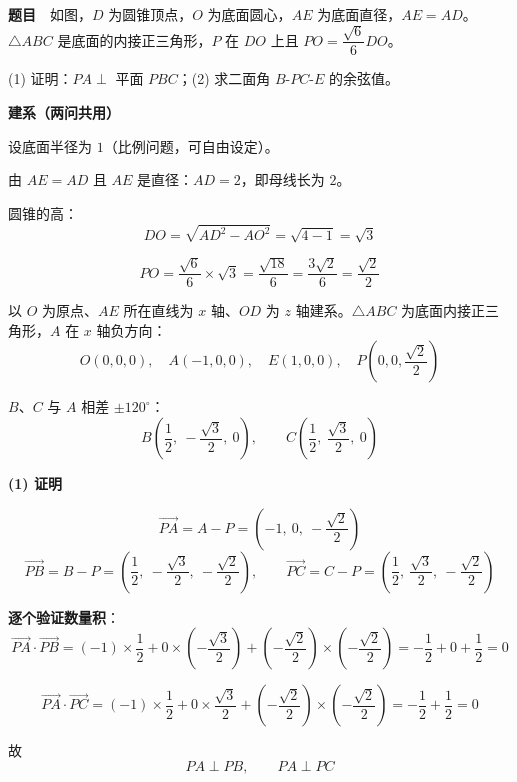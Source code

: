 \par\medskip


\textbf{题目}　如图，$D$ 为圆锥顶点，$O$ 为底面圆心，$AE$ 为底面直径，$AE=AD$。$\triangle ABC$ 是底面的内接正三角形，$P$ 在 $DO$ 上且 $PO=\dfrac{\sqrt6}6DO$。

\begin{center}\end{center}

  (1) 证明：$PA\perp$ 平面 $PBC$；(2) 求二面角 $B\text{-}PC\text{-}E$ 的余弦值。

\par\medskip

\textbf{建系（两问共用）}

设底面半径为 $1$（比例问题，可自由设定）。

由 $AE=AD$ 且 $AE$ 是直径：$AD=2$，即母线长为 $2$。

圆锥的高：
\[DO=\sqrt{AD^{2}-AO^{2}}=\sqrt{4-1}=\sqrt3\]

\[PO=\frac{\sqrt6}6\times\sqrt3=\frac{\sqrt{18}}6=\frac{3\sqrt2}6=\frac{\sqrt2}2\]

以 $O$ 为原点、$AE$ 所在直线为 $x$ 轴、$OD$ 为 $z$ 轴建系。$\triangle ABC$ 为底面内接正三角形，$A$ 在 $x$ 轴负方向：
\[O(0,0,0),\quad A(-1,0,0),\quad E(1,0,0),\quad P\left(0,0,\frac{\sqrt2}2\right)\]

$B$、$C$ 与 $A$ 相差 $\pm120^\circ$：
\[B\left(\frac12,\ -\frac{\sqrt3}2,\ 0\right),\qquad C\left(\frac12,\ \frac{\sqrt3}2,\ 0\right)\]

\par\medskip

\textbf{(1) 证明}

\[\overrightarrow{PA}=A-P=\left(-1,\ 0,\ -\frac{\sqrt2}2\right)\]
\[\overrightarrow{PB}=B-P=\left(\frac12,\ -\frac{\sqrt3}2,\ -\frac{\sqrt2}2\right),\qquad \overrightarrow{PC}=C-P=\left(\frac12,\ \frac{\sqrt3}2,\ -\frac{\sqrt2}2\right)\]

\textbf{逐个验证数量积}：
\[\overrightarrow{PA}\cdot\overrightarrow{PB}=(-1)\times\frac12+0\times\left(-\frac{\sqrt3}2\right)+\left(-\frac{\sqrt2}2\right)\times\left(-\frac{\sqrt2}2\right)=-\frac12+0+\frac12=0\]

\[\overrightarrow{PA}\cdot\overrightarrow{PC}=(-1)\times\frac12+0\times\frac{\sqrt3}2+\left(-\frac{\sqrt2}2\right)\times\left(-\frac{\sqrt2}2\right)=-\frac12+\frac12=0\]

故
\[PA\perp PB,\qquad PA\perp PC\]

